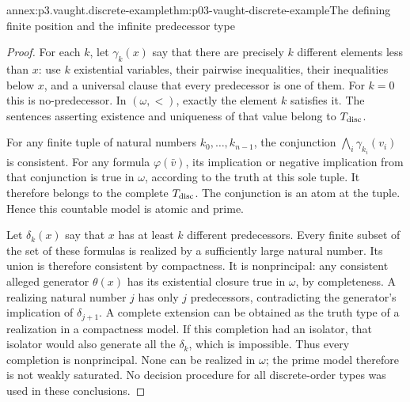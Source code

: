 \begin{annexitem}{annex:p3.vaught.discrete-example}{thm:p03-vaught-discrete-example}{The defining finite position and the infinite predecessor type}
\begin{proof}
For each \(k\), let \(\gamma_k(x)\) say that there are precisely
\(k\) different elements less than \(x\): use \(k\) existential
variables, their pairwise inequalities, their inequalities below
\(x\), and a universal clause that every predecessor is one of them.
For \(k=0\) this is no-predecessor.
In \((\omega,<)\), exactly the element \(k\) satisfies it.
The sentences asserting existence and uniqueness of that value
belong to \(T_{\rm disc}\).

For any finite tuple of natural numbers \(k_0,\ldots,k_{n-1}\),
the conjunction \(\bigwedge_i\gamma_{k_i}(v_i)\) is consistent.
For any formula \(\varphi(\bar v)\), its implication or negative
implication from that conjunction is true in \(\omega\), according
to the truth at this sole tuple. It therefore belongs to the
complete \(T_{\rm disc}\).
The conjunction is an atom at the tuple. Hence this countable
model is atomic and prime.

Let \(\delta_k(x)\) say that \(x\) has at least \(k\) different
predecessors. Every finite subset of the set of these formulas
is realized by a sufficiently large natural number.
Its union is therefore consistent by compactness.
It is nonprincipal: any consistent alleged generator \(\theta(x)\)
has its existential closure true in \(\omega\), by completeness.
A realizing natural number \(j\) has only \(j\) predecessors,
contradicting the generator's implication of \(\delta_{j+1}\).
A complete extension can be obtained as the truth type of a
realization in a compactness model. If this completion had an
isolator, that isolator would also generate all the \(\delta_k\),
which is impossible. Thus every completion is nonprincipal.
None can be realized in \(\omega\); the prime model therefore is
not weakly saturated. No decision procedure for all discrete-order
types was used in these conclusions.
\end{proof}
\end{annexitem}

